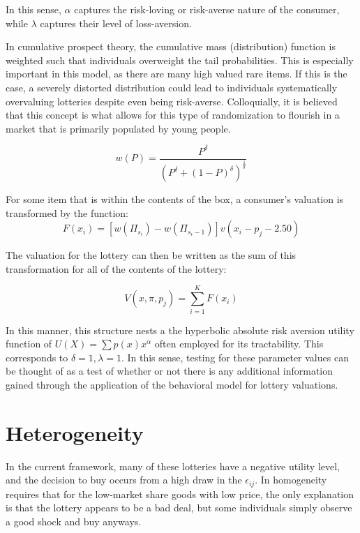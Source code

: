 \documentclass[12pt]{paper}
\newcommand{\brak}[1]{ \left [ #1 \right ] }
\begin{document}
In this sense, $\alpha$ captures the risk-loving or risk-averse nature of
the consumer, while $\lambda$ captures their level of loss-aversion.

In cumulative prospect theory, the cumulative mass (distribution)
function is weighted such that individuals overweight the tail
probabilities. This is especially important in this model, as there are
many high valued rare items. If this is the case, a severely distorted
distribution could lead to individuals systematically overvaluing
lotteries despite even being risk-averse. Colloquially, it is believed
that this concept is what allows for this type of randomization to
flourish in a market that is primarily populated by young people.

\begin{equation*}
  w(P) = \frac{ P^\delta }{( P^\delta + (1-P)^\delta )^{\frac{1}{\delta}}}
\end{equation*}

For some item that is within the contents of the box, a consumer's
valuation is transformed by the function:
\begin{equation*}
F(x_i) = \brak{w( \Pi_{s_i}) - w(\Pi_{s_i - 1}) } v( x_i - p_j - 2.50)
\end{equation*}

The valuation for the lottery can then be written as the sum of this
transformation for all of the contents of the lottery:

\begin{equation*}
  V(x,\pi,p_j) = \sum_{i=1}^K F( x_i)
\end{equation*}

In this manner, this structure nests a the hyperbolic absolute risk
aversion utility function of $U(X) = \sum p(x) x^{\alpha}$ often employed for
its tractability. This corresponds to $\delta = 1, \lambda = 1$. In this sense,
testing for these parameter values can be thought of as a test of
whether or not there is any additional information gained through the
application of the behavioral model for lottery valuations.


\section{Heterogeneity}

In the current framework, many of these lotteries have a
negative utility level, and the decision to buy occurs from a high draw
in the $\epsilon_{ij}$. In homogeneity requires that for the low-market share
goods with low price, the only explanation is that the lottery appears
to be a bad deal, but some individuals simply observe a good shock and
buy anyways.
\end{document}
